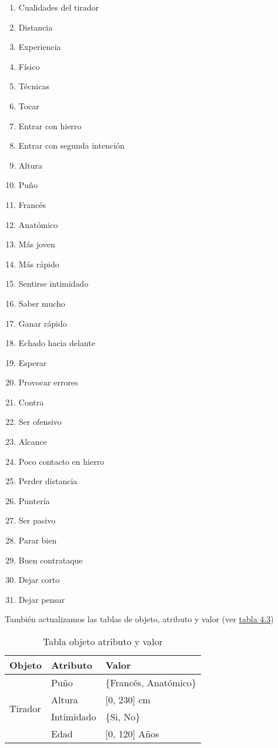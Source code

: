 \begin{enumerate}

  \item Cualidades del tirador
  \item Distancia
  \item Experiencia
  \item Físico
  \item Técnicas
  \item Tocar
  \item Entrar con hierro
  \item Entrar con segunda intención
  \item Altura
  \item Puño
  \item Francés
  \item Anatómico
  \item Más joven
  \item Más rápido
  \item Sentirse intimidado
  \item Saber mucho
  \item Ganar rápido
  \item Echado hacia delante
  \item Esperar
  \item Provocar errores
  \item Contra
  \item Ser ofensivo
  \item Alcance
  \item Poco contacto en hierro
  \item Perder distancia
  \item Puntería
  \item Ser pasivo
  \item Parar bien
  \item Buen contrataque
  \item Dejar corto
  \item Dejar pensar

\end{enumerate}

También actualizamos las tablas de objeto, atributo y valor (ver \hyperref[tab:Tabla objeto atributo y valor]{tabla 4.3})

\begin{table}[]
  \centering
  \caption{Tabla objeto atributo y valor}
  \label{tab:Tabla objeto atributo y valor}
  \begin{tabular}{lll}
    Objeto & Atributo & Valor \\ \hline
    \multicolumn{1}{l|}{\multirow{4}{*}{Tirador}} & Puño & \{Francés, Anatómico\} \\ \cline{2-3}
    \multicolumn{1}{l|}{} & Altura & {[}0, 230{]} cm \\ \cline{2-3}
    \multicolumn{1}{l|}{} & Intimidado & \{Si, No\} \\ \cline{2-3}
    \multicolumn{1}{l|}{} & Edad & {[}0, 120{]} Años \\ \cline{2-3}
  \end{tabular}
\end{table}

